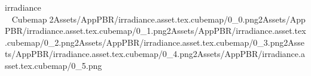
   irradiance                 Cubemap   2   Assets/AppPBR/irradiance.asset.tex.cubemap/0_0.png2   Assets/AppPBR/irradiance.asset.tex.cubemap/0_1.png2   Assets/AppPBR/irradiance.asset.tex.cubemap/0_2.png2   Assets/AppPBR/irradiance.asset.tex.cubemap/0_3.png2   Assets/AppPBR/irradiance.asset.tex.cubemap/0_4.png2   Assets/AppPBR/irradiance.asset.tex.cubemap/0_5.png